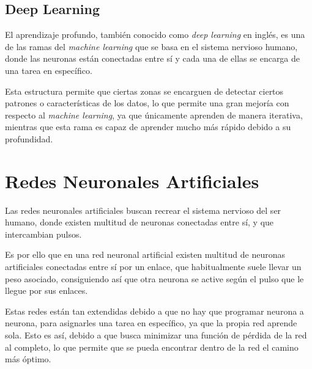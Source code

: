 \subsection{Deep Learning}
El aprendizaje profundo, también conocido como \emph{deep learning} en inglés, es una de las ramas del \emph{machine learning} que se basa en el sistema nervioso humano, donde las neuronas están conectadas entre sí y cada una de ellas se encarga de una tarea en específico.

Esta estructura permite que ciertas zonas se encarguen de detectar ciertos patrones o características de los datos, lo que permite una gran mejoría con respecto al \emph{machine learning}, ya que únicamente aprenden de manera iterativa, mientras que esta rama es capaz de aprender mucho más rápido debido a su profundidad.

\section{Redes Neuronales Artificiales}
Las redes neuronales artificiales \cite{izaurieta2000redes} buscan recrear el sistema nervioso del ser humano, donde existen multitud de neuronas conectadas entre sí, y que intercambian pulsos.

Es por ello que en una red neuronal artificial existen multitud de neuronas artificiales conectadas entre sí por un enlace, que habitualmente suele llevar un peso asociado, consiguiendo así que otra neurona se active según el pulso que le llegue por sus enlaces.

Estas redes están tan extendidas debido a que no hay que programar neurona a neurona, para asignarles una tarea en específico, ya que la propia red aprende sola. Esto es así, debido a que busca minimizar una función de pérdida de la red al completo, lo que permite que se pueda encontrar dentro de la red el camino más óptimo.

